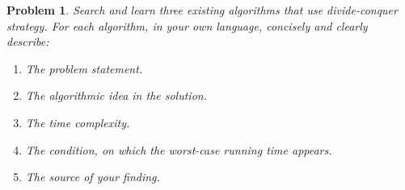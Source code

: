 \documentclass[11pt]{article}
\newtheorem{problem}{Problem}
\begin{document}
\bigskip

\begin{problem}
 \label{prob:3} Search and learn three existing algorithms that use divide-conquer strategy. For each algorithm, in your own language, concisely and clearly describe:
\begin{enumerate}
 \item The problem statement.
 \item The algorithmic idea in the solution.
 \item The time complexity.
 \item The condition, on which the worst-case running time appears.
 \item The source of your finding.
\end{enumerate}
\end{problem}
\end{document}
